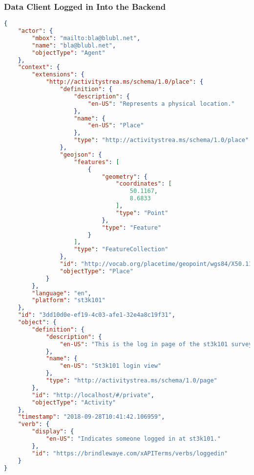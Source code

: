 \subsubsection*{Data Client Logged in Into the Backend}
\begin{lstlisting}[language=JSON]
{
    "actor": {
        "mbox": "mailto:bla@blubl.net",
        "name": "bla@blubl.net",
        "objectType": "Agent"
    },
    "context": {
        "extensions": {
            "http://activitystrea.ms/schema/1.0/place": {
                "definition": {
                    "description": {
                        "en-US": "Represents a physical location."
                    },
                    "name": {
                        "en-US": "Place"
                    },
                    "type": "http://activitystrea.ms/schema/1.0/place"
                },
                "geojson": {
                    "features": [
                        {
                            "geometry": {
                                "coordinates": [
                                    50.1167,
                                    8.6833
                                ],
                                "type": "Point"
                            },
                            "type": "Feature"
                        }
                    ],
                    "type": "FeatureCollection"
                },
                "id": "http://vocab.org/placetime/geopoint/wgs84/X50.1167Y8.6833.html",
                "objectType": "Place"
            }
        },
        "language": "en",
        "platform": "st3k101"
    },
    "id": "3dd10d0e-ef19-4c03-afe1-32e4a8c19f31",
    "object": {
        "definition": {
            "description": {
                "en-US": "This is the log in page of the st3k101 survey tool."
            },
            "name": {
                "en-US": "St3k101 login view"
            },
            "type": "http://activitystrea.ms/schema/1.0/page"
        },
        "id": "http://localhost/#/private",
        "objectType": "Activity"
    },
    "timestamp": "2018-09-28T10:41:42.106959",
    "verb": {
        "display": {
            "en-US": "Indicates someone logged in at st3k101."
        },
        "id": "https://brindlewaye.com/xAPITerms/verbs/loggedin"
    }
}
\end{lstlisting}



